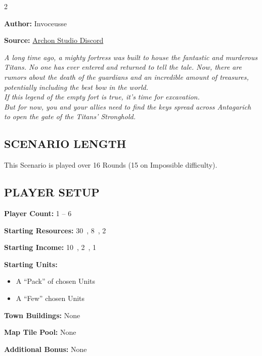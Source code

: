 
\begin{multicols*}{2}

\textbf{Author:} Invoceusse

\textbf{Source:} \href{https://discord.com/channels/740870068178649108/1219333721019256943}{Archon Studio Discord}

\textit{A long time ago, a mighty fortress was built to house the fantastic and murderous Titans.
  No one has ever entered and returned to tell the tale.
  Now, there are rumors about the death of the guardians and an incredible amount of treasures, potentially including the best bow in the world.\\
  If this legend of the empty fort is true, it's time for excavation.\\
  But for now, you and your allies need to find the keys spread across Antagarich to open the gate of the Titans' Stronghold.
}

\subsection*{\MakeUppercase{Scenario Length}}

This Scenario is played over 16 Rounds (15 on Impossible difficulty).

\subsection*{\MakeUppercase{Player Setup}}

\textbf{Player Count:} 1 -- 6

\textbf{Starting Resources:} 30~, 8~, 2~

\textbf{Starting Income:} 10~, 2~, 1~

\textbf{Starting Units:}
\begin{itemize}
  \item A ``Pack'' of chosen  Units
  \item A ``Few'' chosen  Units
\end{itemize}

\textbf{Town Buildings:} None

\textbf{Map Tile Pool:} None

\textbf{Additional Bonus:} None


\end{multicols*}
